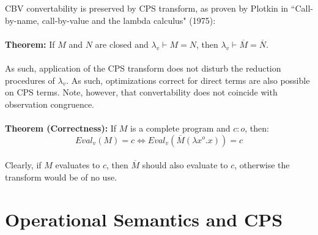 \documentclass[a4paper,10pt]{article}
\begin{document}
CBV convertability is preserved by CPS transform, as proven by Plotkin in ``Call-by-name, call-by-value
and the lambda calculus" (1975):\\
\\
\textbf{Theorem:} If $M$ and $N$ are closed and $\lambda_v \vdash M = N$, then $\lambda_v \vdash
\overline{M} = \overline{N}$.\\
\\
As such, application of the CPS transform does not disturb the reduction procedures of $\lambda_v$.
As such, optimizations correct for direct terms are also possible on CPS terms.
Note, however, that convertability does not coincide with observation congruence.\\
\\
\textbf{Theorem (Correctness):} If $M$ is a complete program and $c : o$, then:\\
\[
 Eval_v(M) = c \iff Eval_v (\overline{M} (\lambda x^o . x)) = c
\]
\\
Clearly, if $M$ evaluates to $c$, then $\overline{M}$ should also evaluate to $c$, otherwise the
transform would be of no use.

\section{Operational Semantics and CPS}
\end{document}
